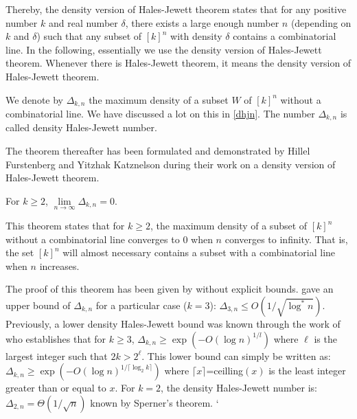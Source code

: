Thereby, the density version of Hales-Jewett theorem states that for any positive number $k$ and real number $\delta$,  there exists a large enough number $n$ (depending on $k$ and $\delta$) such that  any subset of  $[k]^n $ with density $\delta$ contains a combinatorial line.
In the following, essentially  we use  the density version of  Hales-Jewett theorem. Whenever there is Hales-Jewett theorem, it means the density version of Hales-Jewett theorem.

We denote by $\Delta_{k,n}$ the maximum density of a subset $W$ of $[k]^n$ without a combinatorial line. We have discussed a lot on this in \eqref{dhjn}.
The number $\Delta_{k,n}$ is called density Hales-Jewett number.

The theorem thereafter has been formulated and demonstrated  by Hillel Furstenberg and Yitzhak Katznelson  during their work on a density version of Hales-Jewett theorem.

\begin{thm}	For $k\geq 2$, $\lim\limits_{n\longrightarrow \infty} \Delta_{k,n}=0.$ \label{fk}	\end{thm}
 
This theorem states that for $k\geq 2$, the maximum  density of a subset of $[k]^n$ without a combinatorial line converges to $0$ when $n$ converges to infinity. That is,
the set $[k]^n$
will almost necessary
contains a subset with a combinatorial line when $n$ increases.

The proof of this theorem has been given by \cite{furstenberg1991density} without explicit bounds. \cite{polymath2012new} gave an upper bound of $\Delta_{k,n}$ for a particular case ($k=3$): $\Delta_{3,n} \leq O(1/\sqrt{\log^* n}).$ Previously, a lower  density Hales-Jewett bound  was known through the work of \cite{polymath2010density} who establishes that  for $k\geq 3$, $\Delta_{k,n} \geq \exp \left(-O(\log n)^{1/l}\right)$ where $\ell$ is the largest integer such that $2k > 2^{\ell}$. This lower bound can simply be written as: $\Delta_{k,n} \geq \exp \left(-O(\log n)^{1/\lceil \log_2 k \rceil}\right)$ where $\lceil x \rceil$=ceilling$(x)$ is the least integer greater than or equal to $x.$ For $k=2$, the density Hales-Jewett number is: $\Delta_{2,n}=\Theta(1/\sqrt{n})$ known by Sperner's theorem.
`

